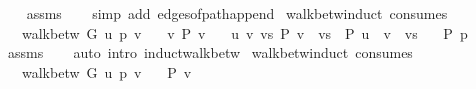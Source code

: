 \begin{isabellebody}
\endisataginvisible
{\isafoldinvisible}%
%
\isadeliminvisible
\isanewline
%
\endisadeliminvisible
%
\isadelimproof
\ \ %
\endisadelimproof
%
\isatagproof
{}\isamarkupfalse%
\ assms\isanewline
\ \ \isamarkupfalse%
\ {\isacharparenleft}{\kern0pt}simp\ add{\isacharcolon}{\kern0pt}\ edges{\isacharunderscore}{\kern0pt}of{\isacharunderscore}{\kern0pt}path{\isacharunderscore}{\kern0pt}append{\isacharunderscore}{\kern0pt}{}{\isacharparenright}{\kern0pt}%
\endisatagproof
{\isafoldproof}%
%
\isadelimproof
\isanewline
%
\endisadelimproof
\isanewline
{}\isamarkupfalse%
\ walk{\isacharunderscore}{\kern0pt}betw{\isacharunderscore}{\kern0pt}induct\ {\isacharbrackleft}{\kern0pt}consumes\ {}{\isacharbrackright}{\kern0pt}{\isacharcolon}{\kern0pt}\isanewline
\ \ \ {\isachardoublequoteopen}walk{\isacharunderscore}{\kern0pt}betw\ G\ u\ p\ v{\isachardoublequoteclose}\isanewline
\ \ \ {\isachardoublequoteopen}{\isasymAnd}v{\isachardot}{\kern0pt}\ P\ {\isacharbrackleft}{\kern0pt}v{\isacharbrackright}{\kern0pt}{\isachardoublequoteclose}\isanewline
\ \ \ {\isachardoublequoteopen}{\isasymAnd}u\ v\ vs{\isachardot}{\kern0pt}\ P\ {\isacharparenleft}{\kern0pt}v\ {\isacharhash}{\kern0pt}\ vs{\isacharparenright}{\kern0pt}\ {\isasymLongrightarrow}\ P\ {\isacharparenleft}{\kern0pt}u\ {\isacharhash}{\kern0pt}\ v\ {\isacharhash}{\kern0pt}\ vs{\isacharparenright}{\kern0pt}{\isachardoublequoteclose}\isanewline
\ \ \ {\isachardoublequoteopen}P\ p{\isachardoublequoteclose}\isanewline
%
\isadelimproof
\ \ %
\endisadelimproof
%
\isatagproof
{}\isamarkupfalse%
\ assms\isanewline
\ \ \isamarkupfalse%
\ {\isacharparenleft}{\kern0pt}auto\ intro{\isacharcolon}{\kern0pt}\ induct{\isacharunderscore}{\kern0pt}walk{\isacharunderscore}{\kern0pt}betw{\isacharparenright}{\kern0pt}%
\endisatagproof
{\isafoldproof}%
%
\isadelimproof
\isanewline
%
\endisadelimproof
\isanewline
{}\isamarkupfalse%
\ walk{\isacharunderscore}{\kern0pt}betw{\isacharunderscore}{\kern0pt}induct{\isacharunderscore}{\kern0pt}{}\ {\isacharbrackleft}{\kern0pt}consumes\ {}{\isacharbrackright}{\kern0pt}{\isacharcolon}{\kern0pt}\isanewline
\ \ \ {\isachardoublequoteopen}walk{\isacharunderscore}{\kern0pt}betw\ G\ u\ p\ v{\isachardoublequoteclose}\isanewline
\ \ \ {\isachardoublequoteopen}P\ {\isacharbrackleft}{\kern0pt}v{\isacharbrackright}{\kern0pt}{\isachardoublequoteclose}\isanewline

\end{isabellebody}
